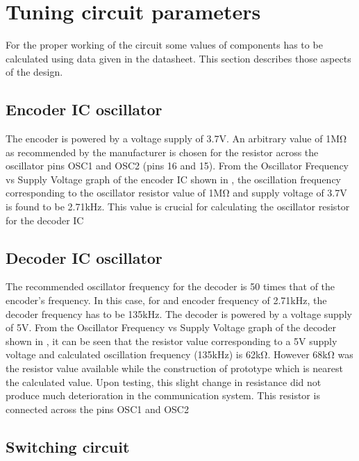 \section{Tuning circuit parameters}
For the proper working of the circuit some values of components has to be calculated using data given in the datasheet. This section describes those aspects of the design.
\subsection{Encoder IC oscillator}


The encoder is powered by a voltage supply of 3.7V. An arbitrary value of 1MΩ as recommended by the manufacturer is chosen for the resistor across the oscillator pins OSC1 and OSC2 (pins 16 and 15). From the Oscillator Frequency vs Supply Voltage graph of the encoder IC shown in , the oscillation frequency corresponding to the oscillator resistor value of 1MΩ and supply voltage of 3.7V is found to be 2.71kHz. This value is crucial for calculating the oscillator resistor for  the decoder IC

\subsection{Decoder IC oscillator}
The recommended oscillator frequency for the decoder is 50 times that of the encoder's frequency. In this case, for and encoder frequency of 2.71kHz, the decoder frequency has to be 135kHz. The decoder is powered by a voltage supply of 5V. From the Oscillator Frequency vs Supply Voltage graph of the decoder shown in , it can be seen that the resistor value corresponding to a 5V supply voltage and calculated oscillation frequency (135kHz) is 62kΩ. However  68kΩ was the resistor value available while the construction of prototype which is nearest the calculated value. Upon testing, this slight change in resistance did not produce much deterioration in the communication system. This resistor is connected across the pins OSC1 and OSC2
\vspace*{10pt}

\vspace*{20pt}

\subsection{Switching circuit}



